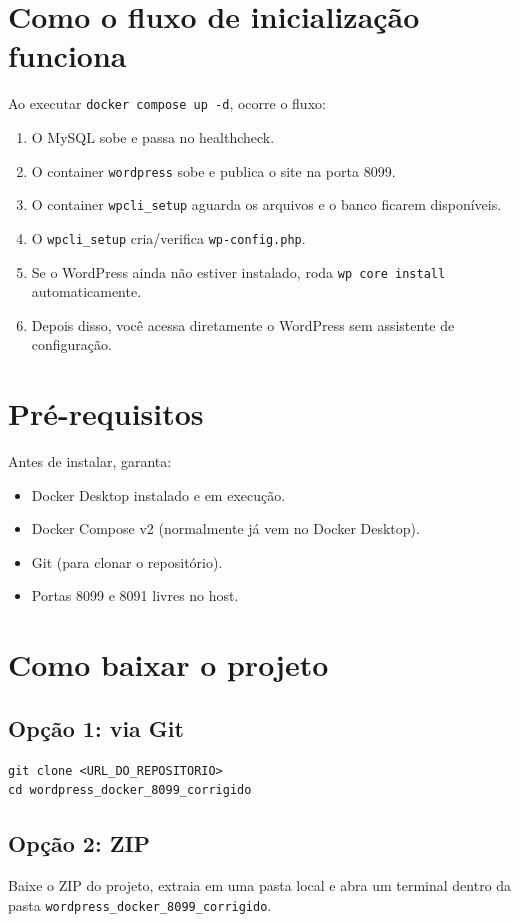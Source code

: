 ﻿\documentclass[12pt,a4paper]{article}
\begin{document}
\section{Como o fluxo de inicializa\c{c}\~ao funciona}
Ao executar \texttt{docker compose up -d}, ocorre o fluxo:
\begin{enumerate}
  \item O MySQL sobe e passa no healthcheck.
  \item O container \texttt{wordpress} sobe e publica o site na porta 8099.
  \item O container \texttt{wpcli\_setup} aguarda os arquivos e o banco ficarem dispon\'iveis.
  \item O \texttt{wpcli\_setup} cria/verifica \texttt{wp-config.php}.
  \item Se o WordPress ainda n\~ao estiver instalado, roda \texttt{wp core install} automaticamente.
  \item Depois disso, voc\^e acessa diretamente o WordPress sem assistente de configura\c{c}\~ao.
\end{enumerate}

\section{Pr\'e-requisitos}
Antes de instalar, garanta:
\begin{itemize}
  \item Docker Desktop instalado e em execu\c{c}\~ao.
  \item Docker Compose v2 (normalmente j\'a vem no Docker Desktop).
  \item Git (para clonar o reposit\'orio).
  \item Portas 8099 e 8091 livres no host.
\end{itemize}

\section{Como baixar o projeto}
\subsection{Op\c{c}\~ao 1: via Git}
\begin{verbatim}
git clone <URL_DO_REPOSITORIO>
cd wordpress_docker_8099_corrigido
\end{verbatim}

\subsection{Op\c{c}\~ao 2: ZIP}
Baixe o ZIP do projeto, extraia em uma pasta local e abra um terminal dentro da pasta \texttt{wordpress\_docker\_8099\_corrigido}.
\end{document}
